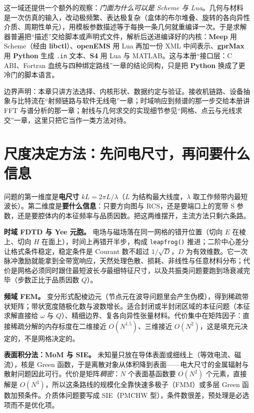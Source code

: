 \documentclass[12pt,a4paper,fontset=fandol]{ctexbook}
\newcommand{\Fn}[1]{\texttt{#1()}}
\newcommand{\Tp}[1]{\texttt{#1}}
\newcommand{\Lib}[1]{\textbf{#1}}
\newcommand{\Lang}[1]{\textsf{\bfseries #1}}
\newcommand{\PY}{\Lang{Python}}
\begin{document}
这一域还提供一个额外的观察：\emph{门面为什么可以是 Scheme 与 Lua}。几何与材料是一次仿真的输入，改动极频繁、表达极复杂（盒体的布尔堆叠、旋转的各向异性介质、周期性单元），用模板参数描述等于每换一条几何就重编译一次。于是求解器普遍把``描述''交给脚本或声明式文件，解析后送进编译好的内核：\Lib{Meep} 用 Scheme（经由 \Lib{libctl}）、\Lib{openEMS} 用 Lua 再加一份 XML 中间表示、\Lib{gprMax} 用 \PY{} 生成 \Tp{.in} 文本、\Lib{S4} 用 Lua 与 MATLAB。这与本册``接口层：C ABI、Fortran 血统与四种绑定路线''一章的结论同构，只是把 \PY{} 换成了更冷门的脚本语言。

边界声明：本章只讲方法选择、内核形状、数据约定与验证。接收机链路、设备抽象与比特流在``射频链路与软件无线电''一章；时域响应到频谱的那一步交给本册讲 FFT 与谱分析的那一章；射线与几何求交的实现细节参见``网格、点云与光线求交''一章，这里只把它当作一类方法对待。

\section{尺度决定方法：先问电尺寸，再问要什么信息}

问题的第一维度是\textbf{电尺寸} $kL = 2\pi L / \lambda$（$L$ 为结构最大线度，$\lambda$ 取工作频带内最短波长）。第二维度是\textbf{要什么信息}：只要方向图与 RCS，还是要端口上的宽带 S 参数，还是要腔体内的本征频率与品质因数。把这两维摆开，主流方法只剩六条路。

\textbf{时域 FDTD 与 Yee 元胞。} 电场与磁场落在同一网格的错开位置（切向 $E$ 在棱上、切向 $H$ 在面上），时间上再错开半步，构成 \Fn{leapfrog} 推进；二阶中心差分让格式条件稳定，稳定条件是 Courant 数不超过 $1/\sqrt{D}$，$D$ 为有效维数。它一次脉冲激励就能拿到全带宽响应，天然处理色散、损耗、非线性与任意材料分布；代价是网格必须同时跟住最短波长\emph{与}最细特征尺寸，以及共振类问题要跑到场衰减完毕（步数正比于品质因数 $Q$）。

\textbf{频域 FEM。} 变分形式配棱边元（节点元在波导问题里会产生伪模），得到稀疏带状矩阵；带状宽度随极化数与波数增长。适合封闭或半封闭区域的本征问题（本征求解直接给 $\omega$ 与 $Q$）、精细边界、复各向异性张量材料。代价集中在矩阵因子：直接稀疏分解的内存标度在二维接近 $O(N^{1.5})$、三维接近 $O(N^{2})$，这是填充元决定的，不是网格决定的。

\textbf{表面积分法：MoM 与 SIE。} 未知量只放在导体表面或细线上（等效电流、磁流），核是 Green 函数，于是离散对象从体积降到表面——电大尺寸的金属辐射与散射问题因此可行。代价是矩阵\emph{稠密}：$N$ 个表面基函数要 $O(N^{2})$ 个元素，直接解是 $O(N^{3})$，所以这条路线的规模化全靠快速多极子（FMM）或多层 Green 函数加预条件。介质体问题要写成 SIE（PMCHW 型），条件数很差，预处理是必选项而不是优化项。
\end{document}
